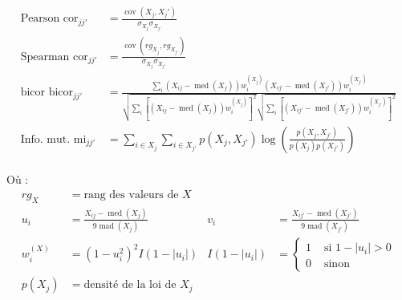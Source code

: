 \begin{align} 
    \text{Pearson  } \operatorname{cor}_{jj'} & = \frac{\operatorname{cov}(X_j,X_j')}{\sigma_{X_{j}} \sigma_{X_{j'}}} \label{simscore_base_pearson} \\
    \text{Spearman  } \operatorname{cor}_{jj'} & = \frac{\operatorname{cov}(rg_{X_j},rg_{X_{j'}})}{\sigma_{X_j}\sigma_{X_{j'}}} \label{simscore_base_spearman} \\
    \text{bicor  } \operatorname{bicor}_{jj'} & = \frac{\underset{i}{\sum}\left(X_{ij}-\operatorname{med}(X_j)\right) w_{i}^{(X_{j})}\left(X_{ij'}-\operatorname{med}(X_{j'})\right) w_{i}^{(X_{j'})}}{\sqrt{\underset{i}{\sum}\left[\left(X_{ij}-\operatorname{med}(X_{j})\right) w_{i}^{(X_j)}\right]^{2}} \sqrt{\underset{i}{\sum}\left[\left(X_{ij'}-\operatorname{med}(X_{j'})\right) w_{i}^{(X_{j'})}\right]^{2}}} \label{simscore_base_bicor} \\
    \text{Info. mut.  } \operatorname{mi}_{jj'} & = \sum_{i \in X_{j}} \sum_{i \in X_{j'}} p(X_j, X_{j'}) \log \left(\frac{p(X_j, X_{j'})}{p(X_j) p(X_{j'})}\right) \label{simscore_base_mi} 
\end{align} \\
Où :
\begin{align*}
    rg_X &= \text{rang des valeurs de } X \\
    u_{i} &=\frac{X_{ij}-\operatorname{med}(X_{j})}{9 \operatorname{mad}(X_{j})}   &
    v_{i} &=\frac{X_{ij'}-\operatorname{med}(X_{j'})}{9 \operatorname{mad}(X_{j'})} \\    
    w_{i}^{(X)} &= \left(1-u_{i}^{2}\right)^{2} I\left(1-\left|u_{i}\right|\right)   &
    I\left(1-\left|u_{i}\right|\right) &= \begin{cases}1 & \text{ si } 1-\left|u_{i}\right| > 0 \\ 0 & \text{ sinon}\end{cases} \\ 
    p(X_j) & = \text{densité de la loi de } X_j
\end{align*}


